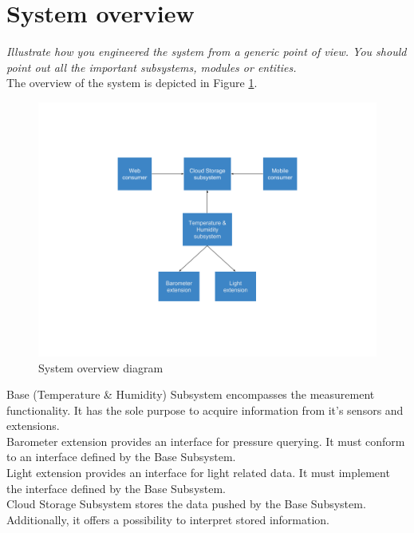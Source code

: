 \documentclass[a4paper,11pt]{article}
\begin{document}
\section{System overview}
\textit{Illustrate how you engineered the system from a generic point of view. You should point out all the important subsystems, modules or entities.}\\

The overview of the system is depicted in Figure \ref{fig:system}.

\begin{figure}[h]
\centering
\includegraphics[scale=0.5]{system-overview.png}
\caption{System overview diagram}
\label{fig:system}
\end{figure}

Base (Temperature \& Humidity) Subsystem encompasses the measurement functionality. It has the sole purpose to acquire information from it’s sensors and extensions.\\

Barometer extension provides an interface for pressure querying. It must conform to an interface defined by the Base Subsystem.\\

Light extension provides an interface for light related data. It must implement the interface defined by the Base Subsystem.\\

Cloud Storage Subsystem stores the data pushed by the Base Subsystem. Additionally, it offers a possibility to interpret stored information.\\
\end{document}
